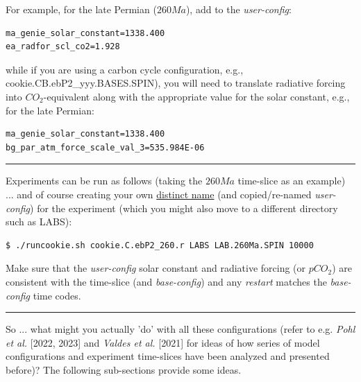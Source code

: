 For example, for the late Permian ($260 Ma$), add to the \textit{user-config}:
\vspace{-2mm}\small\begin{verbatim}
ma_genie_solar_constant=1338.400
ea_radfor_scl_co2=1.928
\end{verbatim}\normalsize\vspace{-2mm}
while if you are using a carbon cycle configuration, e.g., \textsf{\footnotesize cookie.CB.ebP2\_yyy.BASES.SPIN}), you will need to translate radiative forcing into $CO_{2}$-equivalent along with the appropriate value for the solar constant, e.g., for the late Permian:
\vspace{-2mm}\small\begin{verbatim}
ma_genie_solar_constant=1338.400
bg_par_atm_force_scale_val_3=535.984E-06
\end{verbatim}\normalsize\vspace{-2mm}

\vspace{1mm}\noindent\rule{4cm}{0.5pt}\vspace{2mm}

\noindent Experiments can be run as follows (taking the $260 Ma$ time-slice as an example) ... and of course creating your own \uline{distinct name} (and copied/re-named \textit{user-config}) for the experiment (which you might also move to a different directory such as \textsf{\footnotesize LABS}):

\vspace{-2mm}\small\begin{verbatim}
$ ./runcookie.sh cookie.C.ebP2_260.r LABS LAB.260Ma.SPIN 10000
\end{verbatim}\normalsize\vspace{-2mm}

\noindent Make sure that the \textit{user-config} solar constant and radiative forcing (or $pCO_{2}$) are consistent with the time-slice (and \textit{base-config}) and any \textit{restart} matches the \textit{base-config} time codes.

\vspace{1mm}\noindent\rule{4cm}{0.5pt}\vspace{2mm}

\noindent So ... what might you actually 'do' with all these configurations (refer to e.g. \textit{Pohl et al.} [2022, 2023] and \textit{Valdes et al.} [2021] for ideas of how series of model configurations and experiment time-slices have been analyzed and presented before)? The following sub-sections provide some ideas.

